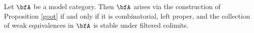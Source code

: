 \begin{Model Categories}






\begin{remark} 
Let $\bfA$ be a model category. Then $\bfA$ arises via the construction of Proposition \ref{goot} if and only if it is combinatorial, left proper, and the collection of weak equivalences in $\bfA$ is stable under filtered colimits. 
\end{remark}
\begin{Didn't Read}


\end{Didn't Read}
\end{Model Categories}
